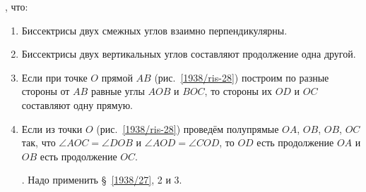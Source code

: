 \smallskip
{}, что:

\begin{enumerate}[resume]
\item
Биссектрисы двух смежных углов взаимно перпендикулярны.

\item
Биссектрисы двух вертикальных углов составляют продолжение одна другой.

\item
Если при точке $O$ прямой $AB$ (рис.~\ref{1938/ris-28}) построим по разные стороны от $AB$ равные углы $AOB$ и $BOC$, то стороны их $OD$ и $OC$ составляют одну прямую.

\item
Если из точки $O$ (рис.~\ref{1938/ris-28}) проведём полупрямые $OA$, $OB$, $OB$, $OC$ так, что $\angle AOC = \angle DOB$ и $\angle AOD=\angle COD$, то $OD$ есть продолжение $OA$ и $OB$ есть продолжение $OC$.

\smallskip
{}.
Надо применить §~\ref{1938/27}, 2 и 3.

\end{enumerate}